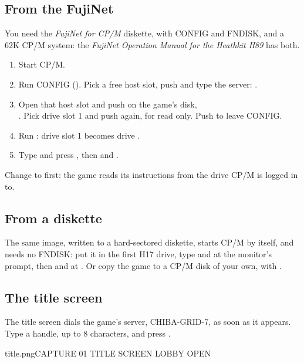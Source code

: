 \documentclass[12pt,letterpaper]{article}
\begin{document}
\subsection{From the FujiNet}
You need the \emph{FujiNet for CP/M} diskette, with CONFIG and FNDISK, and a 62K CP/M system: the \emph{FujiNet
Operation Manual for the Heathkit H89} has both.
\begin{sloppypar}
\begin{enumerate}[nosep]
  \item Start CP/M.
  \item Run CONFIG (). Pick a free host slot, push  and type the server:
    .
  \item Open that host slot and push  on the game's disk,\\ . Pick drive
    slot 1 and push  again, for read only. Push  to leave CONFIG.
  \item Run : drive slot 1 becomes drive .
  \item Type  and press , then  and .
\end{enumerate}
\end{sloppypar}
Change to  first: the game reads its instructions from the drive CP/M is logged in to.

\subsection{From a diskette}
\begin{sloppypar}
The same image, written to a hard-sectored diskette, starts CP/M by itself, and needs no FNDISK: put it in the
first H17 drive, type  and  at the monitor's  prompt, then  and
 at . Or copy the game to a CP/M disk of your own, with .
\end{sloppypar}

\subsection{The title screen}
The title screen dials the game's server, CHIBA-GRID-7, as soon as it appears. Type a handle, up to 8
characters, and press .

\begin{capture}{title.png}{CAPTURE 01 \quad TITLE SCREEN \quad LOBBY OPEN}
\end{capture}
\end{document}
